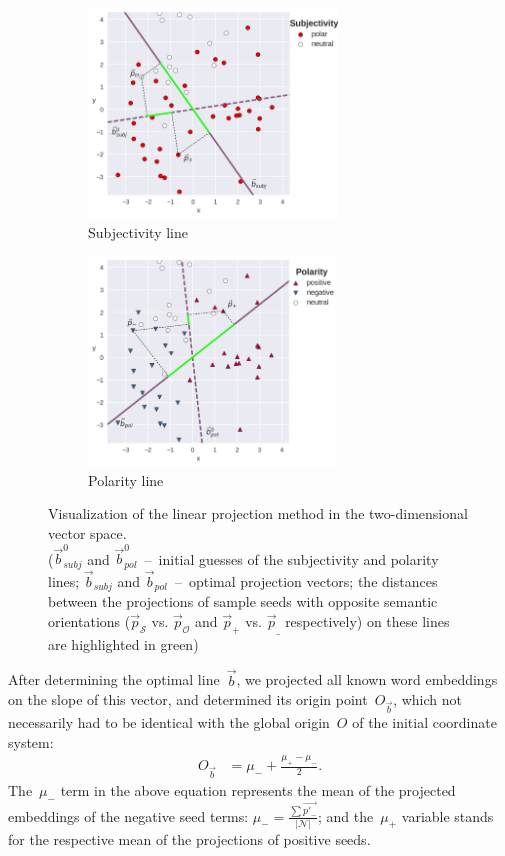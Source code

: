 \begin{figure}[htbp!]
  \centering
  \begin{subfigure}{.45\textwidth}
    \centering
    \mbox{\includegraphics[height=15em]{img/sentilex_subjectivity}}
    \caption{Subjectivity line}
  \end{subfigure}
  \begin{subfigure}{.45\textwidth}
    \centering
    \mbox{\includegraphics[height=15em]{img/sentilex_polarity}}
    \caption{Polarity line}
  \end{subfigure}
  \caption[Visualization of the linear projection method in the
  two-dimensional vector space.]{Visualization of the linear
    projection method in the
    two-dimensional vector space.\\
    (\small $\vec{b}^0_{subj}$ and $\vec{b}^0_{pol}$~--~initial
    guesses of the subjectivity and polarity lines; $\vec{b}_{subj}$
    and $\vec{b}_{pol}$~--~optimal projection vectors; the distances
    between the projections of sample seeds with opposite semantic
    orientations ($\vec{p}_{\mathcal{S}}$ vs. $\vec{p}_{\mathcal{O}}$
    and $\vec{p}_+$ vs. $\vec{p}_\_$ respectively) on these lines are
    highlighted in \textcolor{highlighter green}{green})}
  \label{fig:linproj}
\end{figure}

After determining the optimal line~$\vec{b}$, we projected all known
word embeddings on the slope of this vector, and determined its origin
point~$O_{\vec{b}}$, which not necessarily had to be identical with
the global origin~$O$ of the initial coordinate system: {\small%
  \begin{align}
    O_{\vec{b}} &= \mu_- + \frac{\mu_+ - \mu_-}{2}.
\end{align}\normalsize}%
The~$\mu_-$ term in the above equation represents the mean of the
projected embeddings of the negative seed terms:
$\mu_- = \frac{\sum\vec{p'_-}}{|\mathcal{N}|}$; and the~$\mu_+$
variable stands for the respective mean of the projections of positive
seeds.  %

